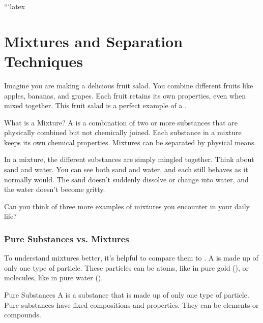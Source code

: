 ```latex
\chapter{Mixtures and Separation Techniques}


\FloatBarrier

Imagine you are making a delicious fruit salad. You combine different fruits like apples, bananas, and grapes. Each fruit retains its own properties, even when mixed together.  This fruit salad is a perfect example of a .

\begin{keyconcept}{What is a Mixture?}
A  is a combination of two or more substances that are physically combined but not chemically joined. Each substance in a mixture keeps its own chemical properties. Mixtures can be separated by physical means.
\end{keyconcept}

In a mixture, the different substances are simply mingled together.  Think about sand and water. You can see both sand and water, and each still behaves as it normally would.  The sand doesn't suddenly dissolve or change into water, and the water doesn't become gritty.


\begin{stopandthink}
Can you think of three more examples of mixtures you encounter in your daily life?
\end{stopandthink}

\subsection{Pure Substances vs. Mixtures}

To understand mixtures better, it's helpful to compare them to . A  is made up of only one type of particle.  These particles can be atoms, like in pure gold (), or molecules, like in pure water ().

\begin{keyconcept}{Pure Substances}
A  is a substance that is made up of only one type of particle. Pure substances have fixed compositions and properties. They can be elements or compounds.
\end{keyconcept}

